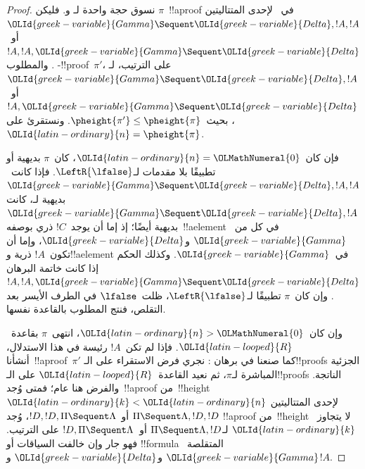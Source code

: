 \documentclass[../../../include/open-logic-section]{subfiles}
\begin{document}
\begin{proof}
نسوق حجة واحدة لـ\RightR{\Contraction} و\LeftR{\Contraction}. فليكن
$\pi$~!!a{proof} في~ لإحدى المتتاليتين
$\OLId{greek-variable}{Gamma}\Sequent\OLId{greek-variable}{Delta},!A,!A$ أو~$!A,!A,\OLId{greek-variable}{Gamma}\Sequent\OLId{greek-variable}{Delta}$. والمطلوب
-!!{proof}~$\pi'$، على الترتيب، لـ$\OLId{greek-variable}{Gamma}\Sequent\OLId{greek-variable}{Delta},!A$
أو~$!A,\OLId{greek-variable}{Gamma}\Sequent\OLId{greek-variable}{Delta}$، بحيث~$\pheight{\pi'}\leq
\pheight{\pi}$. ونستقرئ على~$\OLId{latin-ordinary}{n}=\pheight{\pi}$.

فإن كان~$\OLId{latin-ordinary}{n}=\OLMathNumeral{0}$، كان~$\pi$ بديهية أو تطبيقًا بلا مقدمات لـ$\LeftR{\lfalse}$.
فإذا كانت~$\OLId{greek-variable}{Gamma}\Sequent\OLId{greek-variable}{Delta},!A,!A$ بديهية لـ، كانت
$\OLId{greek-variable}{Gamma}\Sequent\OLId{greek-variable}{Delta},!A$ بديهية أيضًا؛ إذ إما أن يوجد~$!C$ ذري
بوصفه~!!a{element} في كل من~$\OLId{greek-variable}{Gamma}$ و$\OLId{greek-variable}{Delta}$، وإما أن تكون~$!A$ ذرية
و!!a{element} في~$\OLId{greek-variable}{Gamma}$. وكذلك الحكم إذا كانت خاتمة البرهان
$!A,!A,\OLId{greek-variable}{Gamma}\Sequent\OLId{greek-variable}{Delta}$. وإن كان~$\pi$ تطبيقًا لـ$\LeftR{\lfalse}$،
ظلت~$\lfalse$ في الطرف الأيسر بعد التقلص، فنتج المطلوب بالقاعدة نفسها.

وإن كان~$\OLId{latin-ordinary}{n}>\OLMathNumeral{0}$، انتهى~$\pi$ بقاعدة~$\OLId{latin-looped}{R}$. فإذا لم تكن~$!A$ رئيسة في هذا
الاستدلال، أنشأنا~!!a{proof}~$\pi'$ كما صنعنا في برهان
: نجري فرض الاستقراء على الـ!!{proof}s الجزئية
المباشرة لـ$\pi$، ثم نعيد القاعدة~$\OLId{latin-looped}{R}$ على الـ!!{proof}s الناتجة. والفرض هنا عام؛
فمتى وُجد~!!a{proof} من~!!{height}~$\OLId{latin-ordinary}{k}<\OLId{latin-ordinary}{n}$ لإحدى المتتاليتين
$\Pi\Sequent\Lambda,!D,!D$ أو~$!D,!D,\Pi\Sequent\Lambda$، وُجد
!!a{proof} من~!!{height} لا يتجاوز~$\OLId{latin-ordinary}{k}$ لـ$\Pi\Sequent\Lambda,!D$
أو~$!D,\Pi\Sequent\Lambda$ على الترتيب. فهو جار وإن خالفت السياقات أو
!!{formula} المتقلصة~$\OLId{greek-variable}{Gamma}$ و$\OLId{greek-variable}{Delta}$ و$!A$.


\end{proof}
\end{document}
